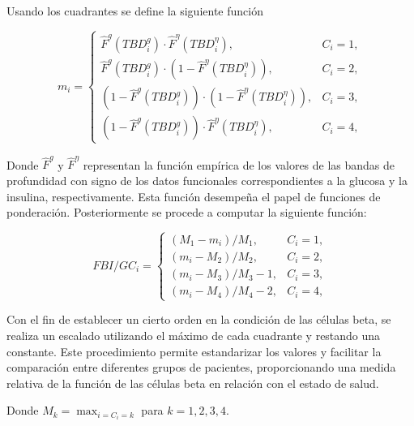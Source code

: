 Usando los cuadrantes se define la siguiente función

\begin{equation}
    m_i= \begin{cases}
    \widehat{F}^g\left(T B D_i^g\right) \cdot \widehat{F}^\eta\left(T B D_i^\eta\right), & C_i=1, \\ \widehat{F}^g\left(T B D_i^g\right) \cdot\left(1-\widehat{F}^\eta\left(T B D_i^\eta\right)\right), & C_i=2, \\ \left(1-\widehat{F}^g\left(T B D_i^g\right)\right) \cdot\left(1-\widehat{F}^\eta\left(T B D_i^\eta\right)\right), & C_i=3, \\ \left(1-\widehat{F}^g\left(T B D_i^g\right)\right) \cdot \widehat{F}^\eta\left(T B D_i^\eta\right), & C_i=4,\end{cases}
\end{equation}


Donde $\widehat{F}^g$ y $\widehat{F}^{\eta}$ representan la función empírica de los valores de las bandas de profundidad con signo de los datos funcionales correspondientes a la glucosa y la insulina, respectivamente. Esta función desempeña el papel de funciones de ponderación. Posteriormente se procede a computar la siguiente función:

\begin{equation}
    F B I / G C_i= \begin{cases}\left(M_1-m_i\right) / M_1, & C_i=1, \\ \left(m_i-M_2\right) / M_2, & C_i=2, \\ \left(m_i-M_3\right) / M_3-1, & C_i=3, \\ \left(m_i-M_4\right) / M_4-2, & C_i=4,\end{cases}
\end{equation}

Con el fin de establecer un cierto orden en la condición de las células beta, se realiza un escalado utilizando el máximo de cada cuadrante y restando una constante. Este procedimiento permite estandarizar los valores y facilitar la comparación entre diferentes grupos de pacientes, proporcionando una medida relativa de la función de las células beta en relación con el estado de salud.

Donde $M_k = \max_{i = C_i = k}$ para $k = 1, 2, 3, 4$.

